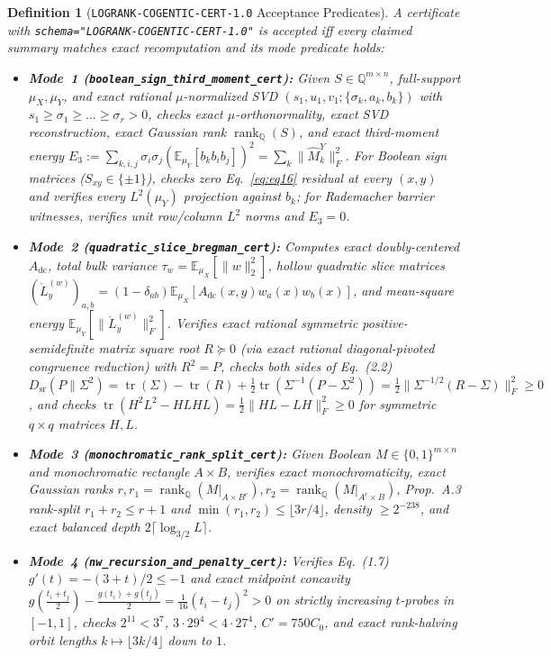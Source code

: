 \documentclass[10pt,twocolumn]{article}
\newtheorem{definition}{Definition}
\newcommand{\QQ}{\mathbb{Q}}
\begin{document}
\begin{definition}[\nolinkurl{LOGRANK-COGENTIC-CERT-1.0} Acceptance Predicates]\label{def:cert}
\normalfont A certificate with \nolinkurl{schema="LOGRANK-COGENTIC-CERT-1.0"} is accepted iff every claimed summary matches exact recomputation and its mode predicate holds:
\begin{itemize}[leftmargin=1.2em,itemsep=1pt,topsep=2pt]
  \item \textbf{Mode~1 (\nolinkurl{boolean_sign_third_moment_cert}):} Given $S\in\QQ^{m\times n}$, full-support $\mu_X,\mu_Y$, and exact rational $\mu$-normalized SVD $(s_1,u_1,v_1;\{\sigma_k,a_k,b_k\})$ with $s_1\ge\sigma_1\ge\dots\ge\sigma_r>0$, checks exact $\mu$-orthonormality, exact SVD reconstruction, exact Gaussian rank $\operatorname{rank}_\QQ(S)$, and exact third-moment energy $E_3 := \sum_{k,i,j}\sigma_i\sigma_j(\mathbb{E}_{\mu_Y}[b_k b_i b_j])^2 = \sum_k \|\widehat{M}^Y_k\|_F^2$. For Boolean sign matrices ($S_{xy}\in\{\pm 1\}$), checks zero Eq.~\eqref{eq:eq16} residual at every $(x,y)$ and verifies every $L^2(\mu_Y)$ projection against $b_k$; for Rademacher barrier witnesses, verifies unit row/column $L^2$ norms and $E_3 = 0$.
  \item \textbf{Mode~2 (\nolinkurl{quadratic_slice_bregman_cert}):} Computes exact doubly-centered $A_{\mathrm{dc}}$, total bulk variance $\tau_w = \mathbb{E}_{\mu_X}[\|w\|_2^2]$, hollow quadratic slice matrices $(\mathring{L}^{(w)}_y)_{a,b} = (1-\delta_{ab})\mathbb{E}_{\mu_X}[A_{\mathrm{dc}}(x,y)w_a(x)w_b(x)]$, and mean-square energy $\mathbb{E}_{\mu_Y}[\|\mathring{L}^{(w)}_y\|_F^2]$. Verifies exact rational symmetric positive-semidefinite matrix square root $R\succeq 0$ (via exact rational diagonal-pivoted congruence reduction) with $R^2=P$, checks both sides of Eq.~(2.2) $D_{\mathrm{sr}}(P\|\Sigma^2) = \operatorname{tr}(\Sigma)-\operatorname{tr}(R)+\frac12\operatorname{tr}(\Sigma^{-1}(P-\Sigma^2)) = \frac12\|\Sigma^{-1/2}(R-\Sigma)\|_F^2 \ge 0$, and checks $\operatorname{tr}(H^2L^2 - HLHL) = \frac12\|HL-LH\|_F^2 \ge 0$ for symmetric $q\times q$ matrices $H,L$.
  \item \textbf{Mode~3 (\nolinkurl{monochromatic_rank_split_cert}):} Given Boolean $M\in\{0,1\}^{m\times n}$ and monochromatic rectangle $A\times B$, verifies exact monochromaticity, exact Gaussian ranks $r, r_1 = \operatorname{rank}_\QQ(M|_{A\times B^c}), r_2 = \operatorname{rank}_\QQ(M|_{A^c\times B})$, Prop.~A.3 rank-split $r_1+r_2\le r+1$ and $\min(r_1,r_2)\le \lfloor 3r/4\rfloor$, density $\ge 2^{-238}$, and exact balanced depth $2\lceil\log_{3/2} L\rceil$.
  \item \textbf{Mode~4 (\nolinkurl{nw_recursion_and_penalty_cert}):} Verifies Eq.~(1.7) $g'(t) = -(3+t)/2 \le -1$ and exact midpoint concavity $g(\frac{t_i+t_j}{2}) - \frac{g(t_i)+g(t_j)}{2} = \frac{1}{16}(t_i-t_j)^2 > 0$ on strictly increasing $t$-probes in $[-1,1]$, checks $2^{11}<3^7$, $3\cdot 29^4<4\cdot 27^4$, $C'=750 C_0$, and exact rank-halving orbit lengths $k\mapsto\lfloor 3k/4\rfloor$ down to $1$.
\end{itemize}
\end{definition}
\end{document}

